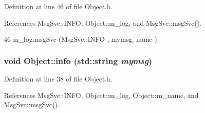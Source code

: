 Definition at line 46 of file Object.h.

References MsgSvc::INFO, Object::m\_\-log, and MsgSvc::msgSvc().


\begin{DoxyCode}
46 { m_log.msgSvc (MsgSvc::INFO    , mymsg, name ); }
\end{DoxyCode}
\hypertarget{classObject_a644fd329ea4cb85f54fa6846484b84a8}{
\subsubsection[{info}]{\setlength{\rightskip}{0pt plus 5cm}void Object::info (std::string {\em mymsg})}}
\label{classObject_a644fd329ea4cb85f54fa6846484b84a8}


Definition at line 38 of file Object.h.

References MsgSvc::INFO, Object::m\_\-log, Object::m\_\-name, and MsgSvc::msgSvc().


